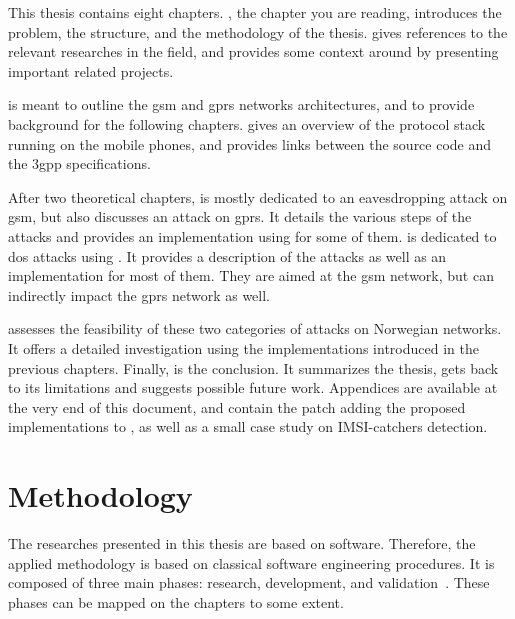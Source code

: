     This thesis contains eight chapters. , the
    chapter you are reading, introduces the problem, the structure, and
    the methodology of the thesis.  gives
    references to the relevant researches in the field, and provides
    some context around  by presenting important related
    projects.

     is meant to outline the \gls{gsm}
    and \gls{gprs} networks architectures, and to provide background for
    the following chapters. 
    gives an overview of the protocol stack running on the mobile
    phones, and provides links between the  source code
    and the \gls{3gpp} specifications.

    After two theoretical chapters,  is
    mostly dedicated to an eavesdropping attack on \gls{gsm}, but also
    discusses an attack on \gls{gprs}. It details the various steps of
    the attacks and provides an implementation using 
    for some of them.  is dedicated to \gls{dos}
    attacks using . It provides a description of the
    attacks as well as an implementation for most of them. They are
    aimed at the \gls{gsm} network, but can indirectly impact the
    \gls{gprs} network as well.

     assesses the
    feasibility of these two categories of attacks on Norwegian
    networks. It offers a detailed investigation using the
    implementations introduced in the previous chapters. Finally,
     is the conclusion. It summarizes the thesis,
    gets back to its limitations and suggests possible future work.
    Appendices are available at the very end of this document, and
    contain the patch adding the proposed implementations to
    , as well as a small case study on IMSI-catchers
    detection.

  \section{Methodology}

    The researches presented in this thesis are based on software.
    Therefore, the applied methodology is based on classical software
    engineering procedures. It is composed of three main phases:
    research, development, and
    validation~\cite{sommerville_software_2007}. These phases can be
    mapped on the chapters to some extent.

